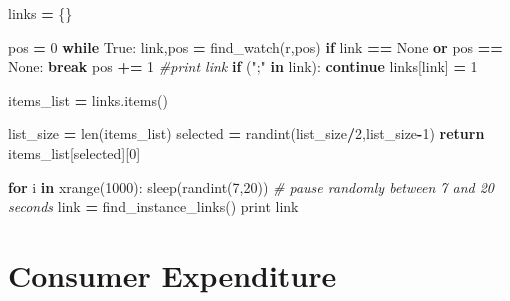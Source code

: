 \documentclass[
]{book}
\newenvironment{Shaded}{\begin{snugshade}}{\end{snugshade}}
\newcommand{\BuiltInTok}[1]{#1}
\newcommand{\CommentTok}[1]{\textcolor[rgb]{0.56,0.35,0.01}{\textit{#1}}}
\newcommand{\ControlFlowTok}[1]{\textcolor[rgb]{0.13,0.29,0.53}{\textbf{#1}}}
\newcommand{\DecValTok}[1]{\textcolor[rgb]{0.00,0.00,0.81}{#1}}
\newcommand{\KeywordTok}[1]{\textcolor[rgb]{0.13,0.29,0.53}{\textbf{#1}}}
\newcommand{\NormalTok}[1]{#1}
\newcommand{\OperatorTok}[1]{\textcolor[rgb]{0.81,0.36,0.00}{\textbf{#1}}}
\newcommand{\StringTok}[1]{\textcolor[rgb]{0.31,0.60,0.02}{#1}}
\newcommand{\VariableTok}[1]{\textcolor[rgb]{0.00,0.00,0.00}{#1}}
\begin{document}
\begin{Shaded}
\begin{Highlighting}[]
\NormalTok{    links }\OperatorTok{=}\NormalTok{ \{\}}

\NormalTok{    pos }\OperatorTok{=} \DecValTok{0}
    \ControlFlowTok{while} \VariableTok{True}\NormalTok{:}
\NormalTok{        link,pos }\OperatorTok{=}\NormalTok{  find\_watch(r,pos)}
        \ControlFlowTok{if}\NormalTok{ link }\OperatorTok{==} \VariableTok{None} \KeywordTok{or}\NormalTok{ pos }\OperatorTok{==} \VariableTok{None}\NormalTok{:}
            \ControlFlowTok{break}
\NormalTok{        pos }\OperatorTok{+=} \DecValTok{1}
        \CommentTok{\#print link}
        \ControlFlowTok{if}\NormalTok{ (}\StringTok{";"} \KeywordTok{in}\NormalTok{ link):}
            \ControlFlowTok{continue}
\NormalTok{        links[link] }\OperatorTok{=} \DecValTok{1}

\NormalTok{    items\_list }\OperatorTok{=}\NormalTok{ links.items()}

\NormalTok{    list\_size }\OperatorTok{=} \BuiltInTok{len}\NormalTok{(items\_list)}
\NormalTok{    selected }\OperatorTok{=}\NormalTok{ randint(list\_size}\OperatorTok{/}\DecValTok{2}\NormalTok{,list\_size}\OperatorTok{{-}}\DecValTok{1}\NormalTok{)}
    \ControlFlowTok{return}\NormalTok{ items\_list[selected][}\DecValTok{0}\NormalTok{]}


\ControlFlowTok{for}\NormalTok{ i }\KeywordTok{in} \BuiltInTok{xrange}\NormalTok{(}\DecValTok{1000}\NormalTok{):}
\NormalTok{    sleep(randint(}\DecValTok{7}\NormalTok{,}\DecValTok{20}\NormalTok{)) }\CommentTok{\# pause randomly between 7 and 20 seconds}
\NormalTok{    link }\OperatorTok{=}\NormalTok{ find\_instance\_links()}
    \BuiltInTok{print}\NormalTok{ link}
\end{Highlighting}
\end{Shaded}

\hypertarget{consumer-expenditure}{%
\section{Consumer Expenditure}\label{consumer-expenditure}}
\end{document}
